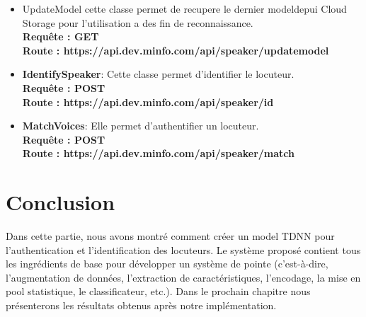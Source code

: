 \begin{itemize}
    \item UpdateModel cette classe permet de recupere le dernier modeldepui Cloud Storage pour l’utilisation a des fin de reconnaissance. \\\textbf{Requête : GET} \\\textbf{Route : https://api.dev.minfo.com/api/speaker/updatemodel }
	

	
    \item \textbf{IdentifySpeaker}: Cette classe permet d’identifier le locuteur. \\\textbf{Requête : POST} \\\textbf{Route : https://api.dev.minfo.com/api/speaker/id}
	

    \item \textbf{MatchVoices}: Elle permet d’authentifier un locuteur. \\\textbf{Requête : POST} \\\textbf{Route : https://api.dev.minfo.com/api/speaker/match}
	

\end{itemize}

		
		
	
					
					
		

\section*{Conclusion}
Dans cette partie, nous avons montré comment créer un model TDNN pour l’authentication et l’identification des locuteurs. Le système proposé contient tous les ingrédients de base pour développer un système de pointe (c'est-à-dire, l'augmentation de données, l'extraction de caractéristiques, l'encodage, la mise en pool statistique, le classificateur, etc.).
Dans le prochain chapitre nous présenterons les résultats obtenus après notre implémentation. 
